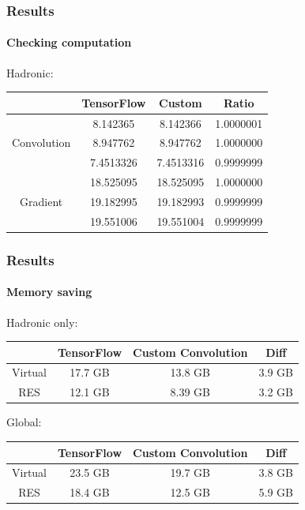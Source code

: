 \documentclass[aspectratio=43]{beamer}
\begin{document}
\begin{frame}

	\frametitle{Results}
	\framesubtitle{Checking computation}
	
	{\Large Hadronic:}
	\begin{table}
		\centering
		\begin{tabular}{c c c c}
			& TensorFlow & Custom & Ratio \\ \hline
			& 8.142365 & 8.142366 & {\color{darkgreen} 1.0000001} \\
			Convolution & 8.947762 & 8.947762 & {\color{darkgreen} 1.0000000} \\
			& 7.4513326 & 7.4513316 & {\color{darkgreen} 0.9999999} \\
			\hline
			& 18.525095 & 18.525095 & {\color{darkgreen} 1.0000000} \\
			Gradient & 19.182995 & 19.182993 & {\color{darkgreen} 0.9999999} \\
			& 19.551006 & 19.551004 & {\color{darkgreen} 0.9999999} \\
			\hline
		\end{tabular}
	\end{table}
	
\end{frame}

\begin{frame}

	\frametitle{Results}
	\framesubtitle{Memory saving}

	{\Large Hadronic only:}
	\begin{table}
		\centering
		\begin{tabular}{c c c c}
			& TensorFlow & Custom Convolution & Diff \\ \hline
			Virtual & {\color{red} 17.7 GB} & {\color{darkgreen} 13.8 GB} & {\color{darkgreen} 3.9 GB} \\
			RES & {\color{red} 12.1 GB} & {\color{darkgreen} 8.39 GB} & {\color{darkgreen} 3.2 GB} \\ \hline
		\end{tabular}
	\end{table}
	
	\hfill

	{\Large Global:}
	\begin{table}
		\centering
		\begin{tabular}{c c c c}
			& TensorFlow & Custom Convolution & Diff \\ \hline
			Virtual & {\color{red} 23.5 GB} & {\color{darkgreen} 19.7 GB} & {\color{darkgreen} 3.8 GB} \\
			RES & {\color{red} 18.4 GB} & {\color{darkgreen} 12.5 GB} & {\color{darkgreen} 5.9 GB} \\ \hline
		\end{tabular}
	\end{table}
	
\end{frame}
\end{document}

